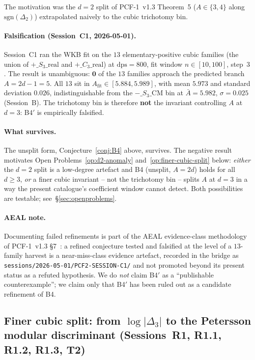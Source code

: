 \documentclass[11pt,a4paper]{article}
\theoremstyle{definition}
\theoremstyle{remark}
\begin{document}
The motivation was the $d=2$ split of PCF-1~v1.3 Theorem~5
($A\in\{3,4\}$ along $\mathrm{sgn}(\Delta_2)$) extrapolated naively to
the cubic trichotomy bin.

\paragraph{Falsification (Session~C1, 2026-05-01).}
Session~C1 ran the WKB fit on the $13$ elementary-positive cubic
families (the union of $+\_S_3\_\mathrm{real}$ and
$+\_C_3\_\mathrm{real}$) at $\mathrm{dps}=800$, fit window
$n\in[10,100]$, step~$3$. The result is unambiguous: $\mathbf{0}$ of
the $13$ families approach the predicted branch $A=2d-1=5$. All $13$
sit in $A_{\mathrm{fit}}\in[5.884, 5.989]$, with mean $5.973$ and
standard deviation $0.026$, indistinguishable from the
$-\_S_3\_\mathrm{CM}$ bin at $\bar{A}=5.982$, $\sigma=0.025$
(Session~B). The trichotomy bin is therefore \textbf{not} the
invariant controlling $A$ at $d=3$: B4$'$ is empirically falsified.

\paragraph{What survives.}
The unsplit form, Conjecture~\ref{conj:B4} above, survives. The
negative result motivates Open Problems~\ref{op:d2-anomaly}
and~\ref{op:finer-cubic-split} below: \emph{either} the $d=2$ split is
a low-degree artefact and B4 (unsplit, $A=2d$) holds for all $d\ge 3$,
\emph{or} a finer cubic invariant -- not the trichotomy bin -- splits
$A$ at $d=3$ in a way the present catalogue's coefficient window
cannot detect. Both possibilities are testable; see~\S\ref{sec:openproblems}.

\paragraph{AEAL note.}
Documenting failed refinements is part of the AEAL evidence-class
methodology of PCF-1~v1.3 \S 7~\cite{Papanokechi2026PCF1}: a refined
conjecture tested and falsified at the level of a $13$-family harvest
is a near-miss-class evidence artefact, recorded in the bridge as
\texttt{sessions/2026-05-01/PCF2-SESSION-C1/} and not promoted beyond
its present status as a refuted hypothesis. We do \emph{not} claim
B4$'$ as a ``publishable counterexample''; we claim only that
B4$'$ has been ruled out as a candidate refinement of B4.

\subsection{Finer cubic split: from $\log|\Delta_3|$ to the
Petersson modular discriminant
(Sessions~R1, R1.1, R1.2, R1.3, T2)}\label{sec:R1-finer-split}
\end{document}
